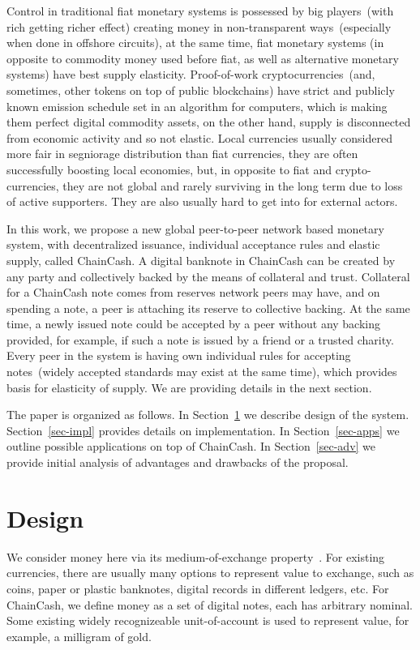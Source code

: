 \documentclass{llncs}   %
\newcommand{\cc}{ChainCash}
\begin{document}
Control in traditional fiat monetary systems is possessed by big players~(with rich getting richer effect) creating
money in non-transparent ways~(especially when done in offshore circuits), at the same time,
fiat monetary systems (in opposite to commodity money used before fiat, as well as alternative monetary systems) have
best supply elasticity. Proof-of-work cryptocurrencies~(and, sometimes, other tokens on top of public blockchains) have strict and
publicly known emission schedule set in an algorithm for computers, which is making them perfect digital commodity assets,
on the other hand, supply is disconnected from economic activity and so not elastic. Local currencies usually considered
more fair in segniorage distribution than fiat currencies, they are often successfully boosting local economies, but,
in opposite to fiat and crypto-currencies, they are not global and rarely surviving in the long term due to loss of active supporters.
They are also usually hard to get into for external actors.

In this work, we propose a new global peer-to-peer network based monetary system, with decentralized issuance, individual acceptance rules and elastic supply, called \cc{}.
A digital banknote in \cc{} can be created by any party and collectively backed by the means of collateral and trust. Collateral for a \cc{} note comes from reserves network peers may have, and on spending a note, a peer is attaching its
reserve to collective backing. At the same time, a newly issued note could be accepted by a peer without any backing provided, for example, if such a note is issued by a friend or a trusted charity. Every peer in the system is having own individual rules
for accepting notes~(widely accepted standards may exist at the same time), which provides basis for elasticity of supply. We are providing details in the next section.

The paper is organized as follows. In Section~\ref{sec-design} we describe design of the system. Section~\ref{sec-impl} provides
details on implementation. In Section~\ref{sec-apps} we outline possible applications on top of \cc{}. In Section~\ref{sec-adv} we provide initial analysis
of advantages and drawbacks of the proposal.

\section{Design}
\label{sec-design}

We consider money here via its medium-of-exchange property~\cite{kiyotaki1989money}. For existing currencies, there are usually many options to represent value to exchange, such as coins, paper or plastic banknotes, digital records in different ledgers, etc. For \cc{}, we define money as a set of digital notes, each has arbitrary nominal. Some existing widely recognizeable unit-of-account is used to represent value, for example, a milligram of gold.
\end{document}
